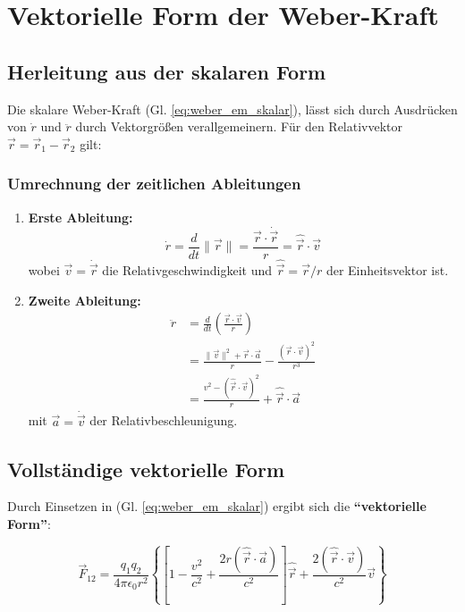 \section{Vektorielle Form der Weber-Kraft}
\subsection{Herleitung aus der skalaren Form}

Die skalare Weber-Kraft (Gl. \ref{eq:weber_em_skalar}), lässt sich durch Ausdrücken von $\dot{r}$ und $\ddot{r}$ durch Vektorgrößen verallgemeinern.
Für den Relativvektor $\vec{r} = \vec{r}_1 - \vec{r}_2$ gilt:

\subsubsection{Umrechnung der zeitlichen Ableitungen}
\begin{enumerate}
\item \textbf{Erste Ableitung:}
\begin{equation}
\dot{r} = \frac{d}{dt}\|\vec{r}\| = \frac{\vec{r} \cdot \dot{\vec{r}}}{r} = \hat{\vec{r}} \cdot \vec{v}
\end{equation}
wobei $\vec{v} = \dot{\vec{r}}$ die Relativgeschwindigkeit und $\hat{\vec{r}} = \vec{r}/r$ der Einheitsvektor ist.

\item \textbf{Zweite Ableitung:}
\begin{align}
\ddot{r} &= \frac{d}{dt}\left(\frac{\vec{r} \cdot \vec{v}}{r}\right) \nonumber \\
&= \frac{\|\vec{v}\|^2 + \vec{r} \cdot \vec{a}}{r} - \frac{(\vec{r} \cdot \vec{v})^2}{r^3} \nonumber \\
&= \frac{v^2 - (\hat{\vec{r}} \cdot \vec{v})^2}{r} + \hat{\vec{r}} \cdot \vec{a}
\end{align}
mit $\vec{a} = \dot{\vec{v}}$ der Relativbeschleunigung.
\end{enumerate}

\subsection{Vollständige vektorielle Form}
Durch Einsetzen in (Gl. \ref{eq:weber_em_skalar}) ergibt sich die \textbf{\enquote{vektorielle Form}}:

\begin{equation}
\vec{F}_{12} = \frac{q_1 q_2}{4\pi\epsilon_0 r^2} \left\{
\left[1 - \frac{v^2}{c^2} + \frac{2r(\hat{\vec{r}} \cdot \vec{a})}{c^2}\right]\hat{\vec{r}} + \frac{2(\hat{\vec{r}} \cdot \vec{v})}{c^2}\vec{v}
\right\}
\label{eq:weber_vector}
\end{equation}

